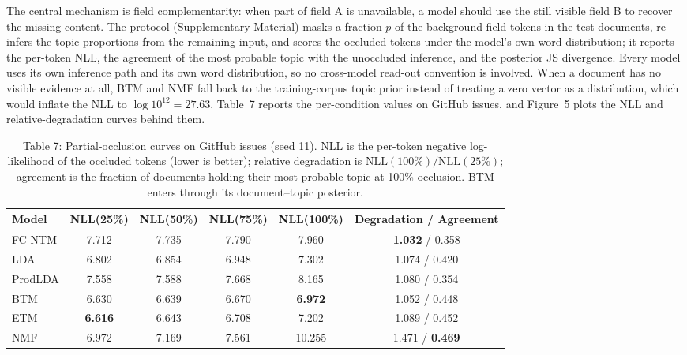 \documentclass{article}
\begin{document}
The central mechanism is field complementarity: when part of field A is unavailable, a model should
use the still visible field B to recover the missing content. The protocol (Supplementary Material)
masks a fraction $p$ of the background-field tokens in the test documents, re-infers the topic
proportions from the remaining input, and scores the occluded tokens under the model's own word
distribution; it reports the per-token NLL, the agreement of the most probable topic with the
unoccluded inference, and the posterior JS divergence. Every model uses its own inference path and
its own word distribution, so no cross-model read-out convention is involved. When a document has
no visible evidence at all, BTM and NMF fall back to the training-corpus topic prior instead of
treating a zero vector as a distribution, which would inflate the NLL to $\log 10^{12}=27.63$.
Table~7 reports the per-condition values on GitHub issues, and
Figure~5 plots the NLL and relative-degradation curves behind them.

\begin{table}[t]
\centering
\caption{Table 7: Partial-occlusion curves on GitHub issues (seed 11). NLL is the per-token negative log-likelihood of the occluded tokens (lower is better); relative degradation is $\mathrm{NLL}(100\%)/\mathrm{NLL}(25\%)$; agreement is the fraction of documents holding their most probable topic at 100\% occlusion. BTM enters through its document--topic posterior.}
\label{tab:occl-robust}
\footnotesize
\setlength{\tabcolsep}{3pt}
\begin{tabular}{@{}lccccc@{}}
\toprule
Model & NLL(25\%) & NLL(50\%) & NLL(75\%) & NLL(100\%) & Degradation / Agreement \\
\midrule
FC-NTM & 7.712 & 7.735 & 7.790 & 7.960 & \textbf{1.032} / 0.358 \\
LDA & 6.802 & 6.854 & 6.948 & 7.302 & 1.074 / 0.420 \\
ProdLDA & 7.558 & 7.588 & 7.668 & 8.165 & 1.080 / 0.354 \\
BTM & 6.630 & 6.639 & 6.670 & \textbf{6.972} & 1.052 / 0.448 \\
ETM & \textbf{6.616} & 6.643 & 6.708 & 7.202 & 1.089 / 0.452 \\
NMF & 6.972 & 7.169 & 7.561 & 10.255 & 1.471 / \textbf{0.469} \\
\bottomrule
\end{tabular}
\end{table}
\end{document}
